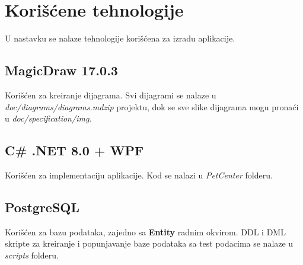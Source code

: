 \section{Korišćene tehnologije}
\par U nastavku se nalaze tehnologije korišćena za izradu aplikacije.
\subsection{MagicDraw 17.0.3}
\par Korišćen za kreiranje dijagrama. Svi dijagrami se nalaze u \textit{doc/diagrams/dia\-grams.mdzip} projektu, dok se sve slike dijagrama mogu pronaći u 
\textit{doc/spe\-cification/img}.
\subsection{C\# .NET 8.0 + WPF}
\par Korišćen za implementaciju aplikacije. Kod se nalazi u \textit{PetCenter} folderu.
\subsection{PostgreSQL}
\par Korišćen za bazu podataka, zajedno sa \textbf{Entity} radnim okvirom. DDL i DML skripte za kreiranje i popunjavanje baze podataka sa test podacima 
se nalaze u \textit{scripts} folderu. 